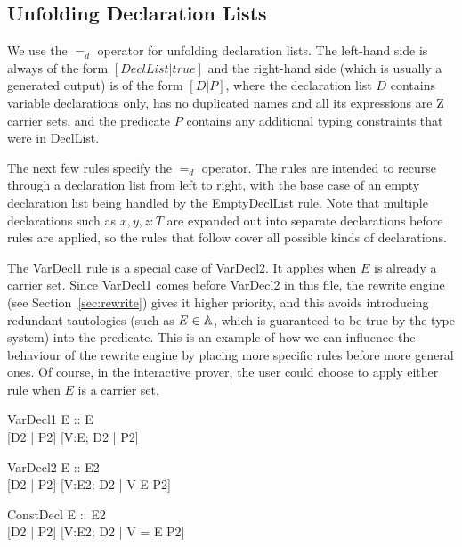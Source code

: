 \documentclass{entcs}
\newcommand{\declListUnfoldsTo}{\mathrel{=_d}}
\begin{document}
\subsection{Unfolding Declaration Lists}

We use the $\declListUnfoldsTo$ operator for unfolding declaration
lists.  The left-hand side is always of the form $[DeclList|true]$ and
the right-hand side (which is usually a generated output) is of the
form $[D|P]$, where the declaration list $D$ contains variable
declarations only, has no duplicated names and all its expressions are
Z carrier sets, and the predicate $P$ contains any additional typing
constraints that were in DeclList.

The next few rules specify the $\declListUnfoldsTo$ operator.
The rules are intended to recurse through a declaration list from left
to right, with the base case of an empty declaration list being handled
by the EmptyDeclList rule.  Note that multiple declarations such as
$x,y,z:T$ are expanded out into separate declarations before rules
are applied, so the rules that follow cover all possible kinds
of declarations.

The VarDecl1 rule is a special case of VarDecl2.  It applies when $E$ is
already a carrier set.  Since VarDecl1 comes before VarDecl2 in this file,
the rewrite engine (see Section~\ref{sec:rewrite}) gives it higher
priority, and this avoids introducing redundant tautologies (such as $E \in
{\mathbb A}$, which is guaranteed to be true by the type system) into the
predicate.  This is an example of how we can influence the behaviour of the
rewrite engine by placing more specific rules before more general ones.  Of
course, in the interactive prover, the user could choose to apply either
rule when $E$ is a carrier set.

\begin{zedrule}{VarDecl1}
   \proviso E :: \power E \\
   [D1 | true] \declListUnfoldsTo [D2 | P2]
\derives
   [V:E; D1 | true] \declListUnfoldsTo [V:E; D2 |  P2]
\end{zedrule}

\begin{zedrule}{VarDecl2}
   \proviso E :: \power E2 \\
   [D1 | true] \declListUnfoldsTo [D2 | P2]
\derives
   [V:E; D1 | true] \declListUnfoldsTo [V:E2; D2 |  V \in E \land P2]
\end{zedrule}

\begin{zedrule}{ConstDecl}
   \proviso E :: E2 \\
   [D1 | true] \declListUnfoldsTo [D2 | P2]
\derives
   [V==E; D1 | true] \declListUnfoldsTo [V:E2; D2 |  V = E \land P2]
\end{zedrule}
\end{document}

